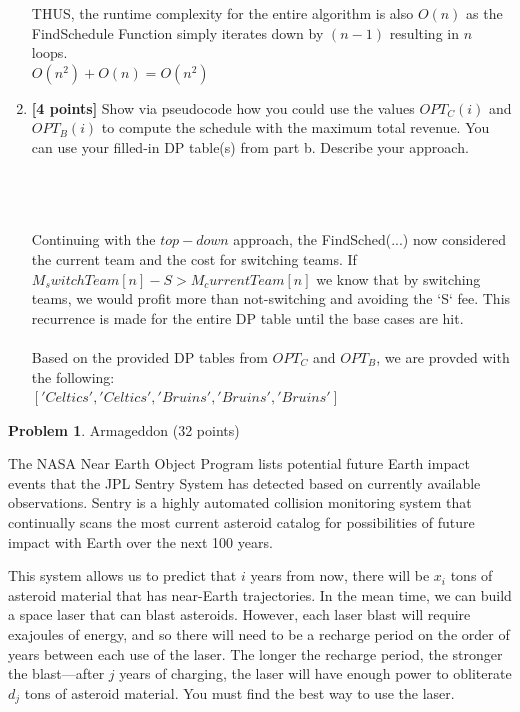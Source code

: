 \documentclass[11pt]{article}
\theoremstyle{definition}
\theoremstyle{theorem}
\newtheorem{prob}{Problem}
\newcommand{\solution}{\medskip\noindent{\color{DarkBlue}\textbf{Solution:}}}
\begin{document}
\begin{enumerate}[label=(\alph*)]
THUS, the runtime complexity for the entire algorithm is also $O(n)$ as the FindSchedule Function simply iterates down by $(n-1)$ resulting in $n$ loops.
\\
$O(n^2) + O(n) = O(n^2)$

\item \textbf{[4 points]} Show via pseudocode how you could use the values $OPT_C(i)$ and $OPT_B(i)$ to compute the schedule with the maximum total revenue. You can use your filled-in DP table(s) from part b. Describe your approach.

\solution \\ 


 \\\\
Continuing with the $top-down$ approach, the FindSched(...) now considered the current team and the cost for switching teams. 
If $M_switchTeam[n] - S > M_currentTeam[n]$ we know that by switching teams, we would profit more than not-switching and avoiding the `S` fee.
This recurrence is made for the entire DP table until the base cases are hit.\\
\\
Based on the provided DP tables from $OPT_C$ and $OPT_B$, we are provded with the following:\\
$['Celtics', 'Celtics', 'Bruins', 'Bruins', 'Bruins']$\\


\end{enumerate}

\newpage




\begin{prob}Armageddon (32 points) \end{prob}

The NASA Near Earth Object Program  lists potential future Earth impact events that the JPL Sentry System has detected based on currently available observations.   Sentry is a highly automated collision monitoring system that continually scans the most current asteroid catalog for possibilities of future impact with Earth over the next 100 years. 

This system allows us to predict that $i$ years from now, there will be $x_i$ tons of asteroid material that has near-Earth trajectories.  In the mean time, we can build a space laser that can blast asteroids.  However,  each laser blast will require exajoules of energy, and so there will need to be a recharge period on the order of years between each use of the laser.  The longer the recharge period, the stronger the blast---after $j$ years of charging, the laser will have enough power to obliterate $d_j$ tons of asteroid material.  You must find the best way to use the laser.
\end{document}

